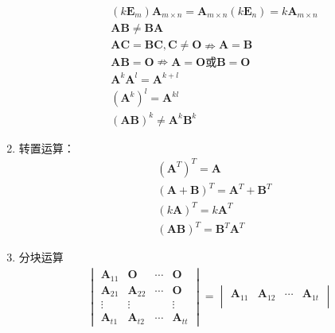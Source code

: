 \documentclass[12pt]{book}
\begin{document}
\begin{enumerate}[1.]
\begin{align*}
               & (k\bm{E}_{m})\bm{A}_{m\times n} = \bm{A}_{m\times n}(k\bm{E}_{n}) = k\bm{A}_{m\times n}                                        \\
               & \bm{AB}\neq \bm{BA}                                                                                                            \\
               & \bm{AC}=\bm{BC}, \bm{C}\neq\bm{O}\nRightarrow \bm{A}=\bm{B}                                                                    \\
               & \bm{AB}=\bm{O} \nRightarrow \bm{A}=\bm{O}\text{或}\bm{B}=\bm{O}                                                                \\
               & \bm{A}^k\bm{A}^{l} = \bm{A}^{k+l}                                                                                              \\
               & (\bm{A}^k)^l = \bm{A}^{kl}                                                                                                     \\
               & (\bm{AB})^{k}\neq \bm{A}^{k}\bm{B}^{k}
          \end{align*}
    \item 转置运算：
          \begin{align*}
               & (\mathbf{A}^{T})^T = \mathbf{A}                         \\
               & (\mathbf{A}+\mathbf{B})^T = \mathbf{A}^T + \mathbf{B}^T \\
               & (k\mathbf{A})^T = k \mathbf{A}^T                        \\
               & (\mathbf{A}\mathbf{B})^T = \mathbf{B}^T \mathbf{A}^T
          \end{align*}
    \item 分块运算
          \begin{gather*}
              \begin{vmatrix}
                  \bm{A}_{11} & \bm{O}      & \cdots & \bm{O}      \\
                  \bm{A}_{21} & \bm{A}_{22} & \cdots & \bm{O}      \\
                  \vdots      & \vdots      &        & \vdots      \\
                  \bm{A}_{t1} & \bm{A}_{t2} & \cdots & \bm{A}_{tt}
              \end{vmatrix}
              = \begin{vmatrix}
                  \bm{A}_{11} & \bm{A}_{12} & \cdots & \bm{A}_{1t} \\

\end{vmatrix}
\end{gather*}
\end{enumerate}
\end{document}
